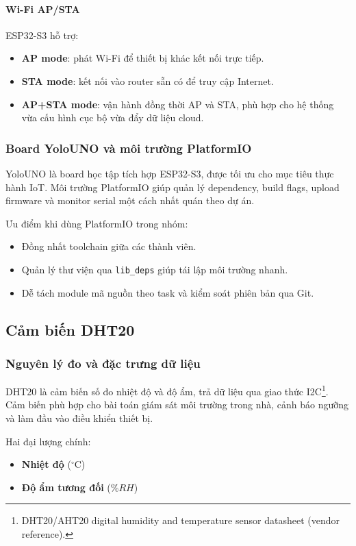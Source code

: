\paragraph{Wi-Fi AP/STA}
ESP32-S3 hỗ trợ:
\begin{itemize}
    \item \textbf{AP mode}: phát Wi-Fi để thiết bị khác kết nối trực tiếp.
    \item \textbf{STA mode}: kết nối vào router sẵn có để truy cập Internet.
    \item \textbf{AP+STA mode}: vận hành đồng thời AP và STA, phù hợp cho hệ thống vừa cấu hình cục bộ vừa đẩy dữ liệu cloud.
\end{itemize}

\subsubsection*{Board YoloUNO và môi trường PlatformIO}

YoloUNO là board học tập tích hợp ESP32-S3, được tối ưu cho mục tiêu thực hành IoT. 
Môi trường PlatformIO giúp quản lý dependency, build flags, 
upload firmware và monitor serial một cách nhất quán theo dự án.

Ưu điểm khi dùng PlatformIO trong nhóm:
\begin{itemize}
    \item Đồng nhất toolchain giữa các thành viên.
    \item Quản lý thư viện qua \texttt{lib\_deps} giúp tái lập môi trường nhanh.
    \item Dễ tách module mã nguồn theo task và kiểm soát phiên bản qua Git.
\end{itemize}

\subsection{Cảm biến DHT20}

\subsubsection*{Nguyên lý đo và đặc trưng dữ liệu}

DHT20 là cảm biến số đo nhiệt độ và độ ẩm, trả dữ liệu qua giao thức I2C\footnote{DHT20/AHT20 digital humidity and temperature sensor datasheet (vendor reference).}. Cảm biến phù hợp cho bài toán giám sát môi trường trong nhà, cảnh báo ngưỡng và làm đầu vào điều khiển thiết bị.

Hai đại lượng chính:
\begin{itemize}
    \item \textbf{Nhiệt độ} (\(^\circ\mathrm{C}\))
    \item \textbf{Độ ẩm tương đối} (\(\%RH\))
\end{itemize}

